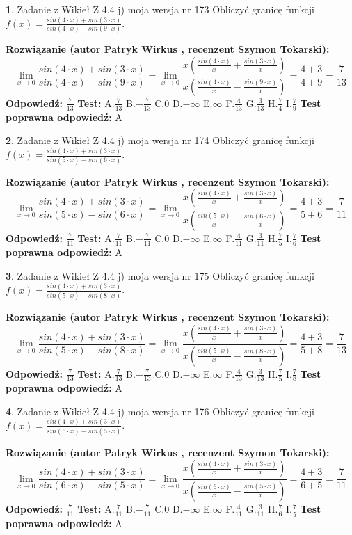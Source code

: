 \documentclass[12pt, a4paper]{article}
\theoremstyle{definition} %
\newtheorem{zad}{}
\newcommand{\zadStart}[1]{\begin{zad}#1\newline}
\newcommand{\zadStop}{\end{zad}}
\newcommand{\rozwStart}[2]{\noindent \textbf{Rozwiązanie (autor #1 , recenzent #2): }\newline}
\newcommand{\rozwStop}{\newline}
\newcommand{\odpStart}{\noindent \textbf{Odpowiedź:}\newline}
\newcommand{\odpStop}{\newline}
\newcommand{\testStart}{\noindent \textbf{Test:}\newline}
\newcommand{\testStop}{\newline}
\newcommand{\kluczStart}{\noindent \textbf{Test poprawna odpowiedź:}\newline}
\newcommand{\kluczStop}{\newline}
\begin{document}
\zadStart{Zadanie z Wikieł Z 4.4 j) moja wersja nr 173}
Obliczyć granicę funkcji $f(x)=\frac{sin(4\cdot x) +sin(3\cdot x)}{sin(4\cdot x) -sin(9\cdot x)}$.
\zadStop
\rozwStart{Patryk Wirkus}{Szymon Tokarski}
$$\lim\limits_{x\to 0}\frac{sin(4\cdot x) +sin(3\cdot x)}{sin(4\cdot x) -sin(9\cdot x)}=\lim\limits_{x\to 0}\frac{x(\frac{sin(4\cdot x)}{x}+\frac{sin(3\cdot x)}{x})}{x(\frac{sin(4\cdot x)}{x}-\frac{sin(9\cdot x)}{x})}=\frac{4+3}{4+9} = \frac{7}{13}$$
\rozwStop
\odpStart
$\frac{7}{13}$
\odpStop
\testStart
A.$\frac{7}{13}$
B.$-\frac{7}{13}$
C.$0$
D.$-\infty$
E.$\infty$
F.$\frac{4}{13}$
G.$\frac{3}{13}$
H.$\frac{7}{4}$
I.$\frac{7}{9}$
\testStop
\kluczStart
A
\kluczStop



\zadStart{Zadanie z Wikieł Z 4.4 j) moja wersja nr 174}
Obliczyć granicę funkcji $f(x)=\frac{sin(4\cdot x) +sin(3\cdot x)}{sin(5\cdot x) -sin(6\cdot x)}$.
\zadStop
\rozwStart{Patryk Wirkus}{Szymon Tokarski}
$$\lim\limits_{x\to 0}\frac{sin(4\cdot x) +sin(3\cdot x)}{sin(5\cdot x) -sin(6\cdot x)}=\lim\limits_{x\to 0}\frac{x(\frac{sin(4\cdot x)}{x}+\frac{sin(3\cdot x)}{x})}{x(\frac{sin(5\cdot x)}{x}-\frac{sin(6\cdot x)}{x})}=\frac{4+3}{5+6} = \frac{7}{11}$$
\rozwStop
\odpStart
$\frac{7}{11}$
\odpStop
\testStart
A.$\frac{7}{11}$
B.$-\frac{7}{11}$
C.$0$
D.$-\infty$
E.$\infty$
F.$\frac{4}{11}$
G.$\frac{3}{11}$
H.$\frac{7}{5}$
I.$\frac{7}{6}$
\testStop
\kluczStart
A
\kluczStop



\zadStart{Zadanie z Wikieł Z 4.4 j) moja wersja nr 175}
Obliczyć granicę funkcji $f(x)=\frac{sin(4\cdot x) +sin(3\cdot x)}{sin(5\cdot x) -sin(8\cdot x)}$.
\zadStop
\rozwStart{Patryk Wirkus}{Szymon Tokarski}
$$\lim\limits_{x\to 0}\frac{sin(4\cdot x) +sin(3\cdot x)}{sin(5\cdot x) -sin(8\cdot x)}=\lim\limits_{x\to 0}\frac{x(\frac{sin(4\cdot x)}{x}+\frac{sin(3\cdot x)}{x})}{x(\frac{sin(5\cdot x)}{x}-\frac{sin(8\cdot x)}{x})}=\frac{4+3}{5+8} = \frac{7}{13}$$
\rozwStop
\odpStart
$\frac{7}{13}$
\odpStop
\testStart
A.$\frac{7}{13}$
B.$-\frac{7}{13}$
C.$0$
D.$-\infty$
E.$\infty$
F.$\frac{4}{13}$
G.$\frac{3}{13}$
H.$\frac{7}{5}$
I.$\frac{7}{8}$
\testStop
\kluczStart
A
\kluczStop



\zadStart{Zadanie z Wikieł Z 4.4 j) moja wersja nr 176}
Obliczyć granicę funkcji $f(x)=\frac{sin(4\cdot x) +sin(3\cdot x)}{sin(6\cdot x) -sin(5\cdot x)}$.
\zadStop
\rozwStart{Patryk Wirkus}{Szymon Tokarski}
$$\lim\limits_{x\to 0}\frac{sin(4\cdot x) +sin(3\cdot x)}{sin(6\cdot x) -sin(5\cdot x)}=\lim\limits_{x\to 0}\frac{x(\frac{sin(4\cdot x)}{x}+\frac{sin(3\cdot x)}{x})}{x(\frac{sin(6\cdot x)}{x}-\frac{sin(5\cdot x)}{x})}=\frac{4+3}{6+5} = \frac{7}{11}$$
\rozwStop
\odpStart
$\frac{7}{11}$
\odpStop
\testStart
A.$\frac{7}{11}$
B.$-\frac{7}{11}$
C.$0$
D.$-\infty$
E.$\infty$
F.$\frac{4}{11}$
G.$\frac{3}{11}$
H.$\frac{7}{6}$
I.$\frac{7}{5}$
\testStop
\kluczStart
A
\kluczStop
\end{document}
